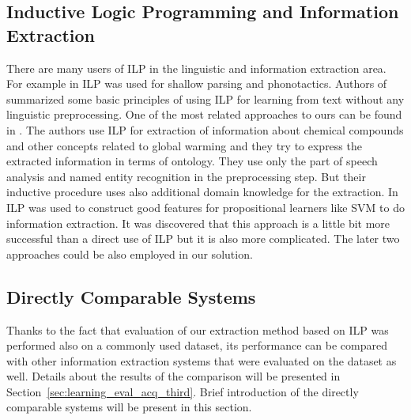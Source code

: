 



\subsection{Inductive Logic Programming and Information Extraction}
There are many users of ILP in the linguistic and information extraction area.
For example in \citep{stasinos:phd} ILP was used for shallow parsing and phonotactics.
Authors of \citep{Junker99learningfor} summarized some basic principles of using ILP for learning from text without any linguistic preprocessing. One of the most related approaches to ours can be found in \citep{aitken02:_learn_infor_extrac_rules}. The authors use ILP for extraction of information about chemical compounds and other concepts related to global warming and they try to express the extracted information in terms of ontology. They use only the part of speech analysis and named entity recognition in the preprocessing step. But their inductive procedure uses also additional domain knowledge for the extraction. In \citep{DBLP:conf/ilp/RamakrishnanJBS07} ILP was used to construct good features for propositional learners like SVM to do information extraction. It was discovered that this approach is a little bit more successful than a direct use of ILP but it is also more complicated. The later two approaches could be also employed in our solution.


\subsection{Directly Comparable Systems} \label{sec:relwork_directly_comparable}

Thanks to the fact that evaluation of our extraction method based on ILP was performed also on a commonly used dataset, its performance can be compared with other information extraction systems that were evaluated on the dataset as well. Details about the results of the comparison will be presented in Section~\ref{sec:learning_eval_acq_third}. Brief introduction of the directly comparable systems will be present in this section.

